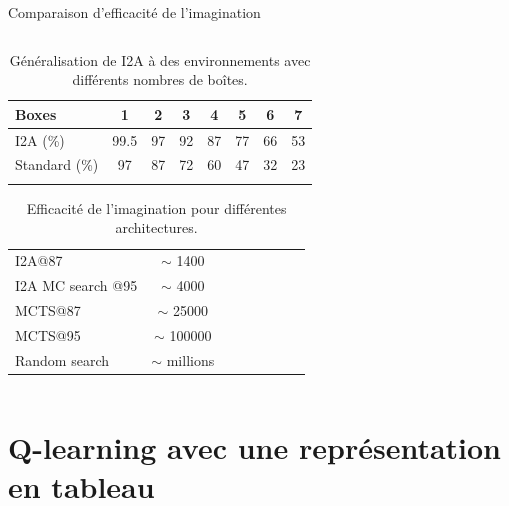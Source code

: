 \documentclass[
	11pt, %
]{beamer}
\begin{document}
\begin{frame}{Comparaison d'efficacité de l'imagination}
    \begin{columns}
        \begin{column}{\textwidth}
            \begin{table}
                \centering
                \begin{tabular}{l|ccccccc}
                    Boxes & 1 & 2 & 3 & 4 & 5 & 6 & 7 \\
                    \hline
                    I2A (\%) & 99.5 & 97 & 92 & 87 & 77 & 66 & 53 \\
                    Standard (\%) & 97 & 87 & 72 & 60 & 47 & 32 & 23 \\
					\caption{Généralisation de I2A à des environnements avec différents nombres de boîtes.}
                \end{tabular}
				
            \end{table}

            \begin{table}
                \centering
                \begin{tabular}{l|ccccccc}
                    I2A@87 & $\sim$ 1400 \\
                    I2A MC search @95 & $\sim$ 4000 \\
                    MCTS@87 & $\sim$ 25000 \\
                    MCTS@95 & $\sim$ 100000 \\
                    Random search & $\sim$ millions \\
                \end{tabular}
				\caption{Efficacité de l'imagination pour différentes architectures.}
            \end{table}
        \end{column}
    \end{columns}
\end{frame}


\section{Q-learning avec une représentation en tableau}
\end{document}
